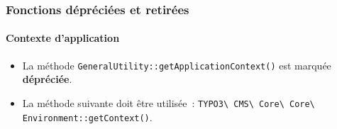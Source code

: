 
\begin{frame}[fragile]
	\frametitle{Fonctions dépréciées et retirées}
	\framesubtitle{Contexte d'application}

	\lstset{basicstyle=\tiny\ttfamily}

	\begin{itemize}
		\item La méthode \texttt{GeneralUtility::getApplicationContext()} est marquée \textbf{dépréciée}.
		\item La méthode suivante doit être utilisée~:\newline
		 	\texttt{TYPO3\textbackslash
				CMS\textbackslash
				Core\textbackslash
				Core\textbackslash
				Environment::getContext()}.

	\end{itemize}

\end{frame}


